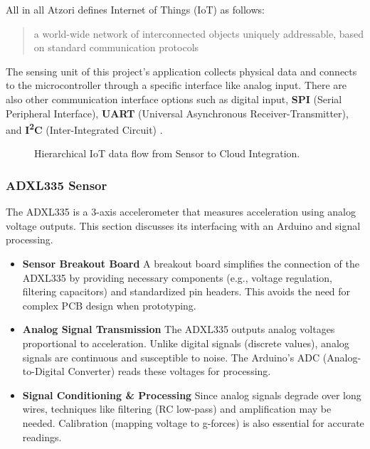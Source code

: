 {All in all Atzori defines Internet of Things (IoT) as follows:
\begin{quote}
a world-wide network of interconnected objects uniquely addressable, based on standard communication protocols
\end{quote}

The sensing unit of this project's application collects physical data and connects to the microcontroller through a specific interface like analog input. There are also other communication interface options such as digital input, \textbf{SPI} (Serial Peripheral Interface), \textbf{UART} (Universal Asynchronous Receiver-Transmitter), and \textbf{I\textsuperscript{2}C} (Inter-Integrated Circuit) \cite{Dharmarathne2025}.

\begin{figure}[h]
    \centering
    \caption{Hierarchical IoT data flow from Sensor to Cloud Integration.}
    \label{fig:IoTHierarchy}
\end{figure}
}
 
\subsubsection{ADXL335 Sensor}  
The ADXL335 is a 3-axis accelerometer that measures acceleration using analog voltage outputs. This section discusses its interfacing with an Arduino and signal processing.  

\begin{itemize}  
	\item \textbf{Sensor Breakout Board}  
	A breakout board simplifies the connection of the ADXL335 by providing necessary components (e.g., voltage regulation, filtering capacitors) and standardized pin headers. This avoids the need for complex PCB design when prototyping.  
	
	\item \textbf{Analog Signal Transmission}  
	The ADXL335 outputs analog voltages proportional to acceleration. Unlike digital signals (discrete values), analog signals are continuous and susceptible to noise. The Arduino's ADC (Analog-to-Digital Converter) reads these voltages for processing.  
	
	\item \textbf{Signal Conditioning \& Processing}  
	Since analog signals degrade over long wires, techniques like filtering (RC low-pass) and amplification may be needed. Calibration (mapping voltage to g-forces) is also essential for accurate readings.  
\end{itemize}




